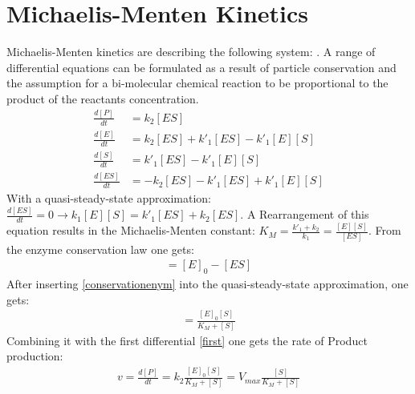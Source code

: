 \documentclass[
  a4paper,BCOR10mm,oneside,
  bibtotoc,idxtotoc,
  headsepline,footsepline,%
  fleqn,openbib
]{scrbook}
\begin{document}
\section{Michaelis-Menten Kinetics}\label{Menten_der}
Michaelis-Menten kinetics are describing the following system:\newline
{}.
A range of differential equations can be formulated as a result of particle conservation and the assumption for a bi-molecular chemical reaction to be proportional to the product of the reactants concentration. 
\begin{align}
\frac{d[P]}{dt} &= k_{\mathrm{2}} [ES] \\ \label{first}
\frac{d[E]}{dt} &= k_{\mathrm{2}} [ES]+k'_{\mathrm{1}} [ES]-k'_{\mathrm{1}} [E][S]\\
\frac{d[S]}{dt} &= k'_{\mathrm{1}} [ES]-k'_{\mathrm{1}} [E][S]\\
\frac{d[ES]}{dt} &=  - k_{\mathrm{2}} [ES] -k'_{\mathrm{1}} [ES]+k'_{\mathrm{1}} [E][S]
\end{align}
With a quasi-steady-state approximation: $\frac{d[ES]}{dt}=0  \longrightarrow k_{\mathrm{1}}[E][S]=k'_{\mathrm{1}}[ES]+k_{\mathrm{2}}[ES]$. A Rearrangement of this equation results in the  Michaelis-Menten constant: $K_M=\frac{k'_{\mathrm{1}}+k_{\mathrm{2}}}{k_{\mathrm{1}}}=\frac{[E][S]}{[ES]}$. From the enzyme conservation law one gets:
\begin{align}
[E]=[E]_0 -[ES] \label{conservationenym}
\end{align}
After inserting \cref{conservationenym} into the quasi-steady-state approximation, one gets:
\begin{align}
 [ES]=\frac{[E]_0 [S]}{K_M+[S]}
\end{align}
Combining it with the first differential \cref{first} one gets the rate of Product production:
\begin{align}
 v= \frac{d[P]}{dt}= k_{\mathrm{2}} \frac{[E]_0 [S]}{K_M+[S]} = V_{max} \frac{[S]}{K_M+[S]}  
\end{align}
\end{document}
